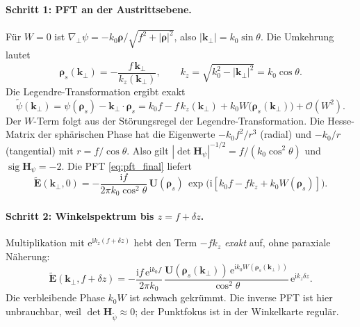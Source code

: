 \documentclass[11pt,a4paper]{scrartcl}
\theoremstyle{insightstyle}
\newcommand{\ii}{\mathrm{i}}
\newcommand{\ee}{\mathrm{e}}
\newcommand{\grad}{\nabla_{\!\perp}}
\newcommand{\Hess}{\bm{H}}
\newcommand{\rh}{\bm{\rho}}
\newcommand{\kp}{\bm{k}_\perp}
\DeclareMathOperator{\sig}{sig}
\begin{document}
\paragraph{Schritt 1: PFT an der Austrittsebene.} Für $W=0$ ist $\grad\psi=-k_0\rh/\sqrt{f^2+|\rh|^2}$, also $|\kp|=k_0\sin\theta$. Die Umkehrung lautet
\begin{equation}
    \rh_s(\kp) = -\frac{f\,\kp}{k_z(\kp)},\qquad k_z=\sqrt{k_0^2-|\kp|^2}=k_0\cos\theta .
\end{equation}
Die Legendre-Transformation ergibt exakt
\begin{equation}
    \tilde\psi(\kp) = \psi(\rh_s)-\kp\cdot\rh_s = k_0f - f\,k_z(\kp) + k_0W\big(\rh_s(\kp)\big) + \mathcal O(W^2).
    \label{eq:exact_legendre}
\end{equation}
Der $W$-Term folgt aus der Störungsregel der Legendre-Transformation. Die Hesse-Matrix der sphärischen Phase hat die Eigenwerte $-k_0f^2/r^3$ (radial) und $-k_0/r$ (tangential) mit $r=f/\cos\theta$. Also gilt $|\det\Hess_\psi|^{-1/2}=f/(k_0\cos^2\theta)$ und $\sig\Hess_\psi=-2$. Die PFT \eqref{eq:pft_final} liefert
\begin{equation}
    \tilde{\bm E}(\kp,0) = -\frac{\ii f}{2\pi k_0\cos^2\theta}\,\bm U(\rh_s)\,\exp\!\big(\ii[k_0f-fk_z+k_0W(\rh_s)]\big).
\end{equation}

\paragraph{Schritt 2: Winkelspektrum bis $z=f+\delta z$.} Multiplikation mit $\ee^{\ii k_z(f+\delta z)}$ hebt den Term $-fk_z$ \emph{exakt} auf, ohne paraxiale Näherung:
\begin{equation}
    \tilde{\bm E}(\kp,f+\delta z) = -\frac{\ii f\,\ee^{\ii k_0f}}{2\pi k_0}\,\frac{\bm U(\rh_s(\kp))\,\ee^{\ii k_0W(\rh_s(\kp))}}{\cos^2\theta}\,\ee^{\ii k_z\delta z}.
    \label{eq:phase_cancellation}
\end{equation}
Die verbleibende Phase $k_0W$ ist schwach gekrümmt. Die inverse PFT ist hier unbrauchbar, weil $\det\Hess_{\tilde\psi}\approx0$; der Punktfokus ist in der Winkelkarte regulär.
\end{document}
